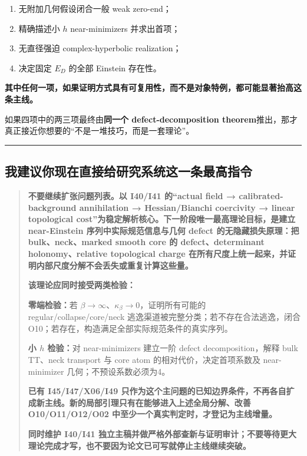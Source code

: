 \documentclass[
  10pt,
]{article}
\providecommand{\tightlist}{%
  \setlength{\itemsep}{0pt}\setlength{\parskip}{0pt}}
\begin{document}
\begin{enumerate}
\def\labelenumi{\arabic{enumi}.}
\tightlist
\item
  无附加几何假设闭合一般 weak zero-end；
\item
  精确描述小 \(h\) near-minimizers 并求出首项；
\item
  无直径强迫 complex-hyperbolic realization；
\item
  决定固定 \(E_D\) 的全部 Einstein 存在性。
\end{enumerate}

\textbf{其中任何一项，如果证明方式具有可复用性，而不是对象特例，都可能显著抬高这条主线。}

如果四项中的两三项最终由\textbf{同一个 defect-decomposition
theorem}推出，那才真正接近你想要的``不是一堆技巧，而是一套理论''。

\begin{center}\rule{0.5\linewidth}{0.5pt}\end{center}

\hypertarget{ux6211ux5efaux8baeux4f60ux73b0ux5728ux76f4ux63a5ux7ed9ux7814ux7a76ux7cfbux7edfux8fd9ux4e00ux6761ux6700ux9ad8ux6307ux4ee4}{%
\subsection{我建议你现在直接给研究系统这一条最高指令}\label{ux6211ux5efaux8baeux4f60ux73b0ux5728ux76f4ux63a5ux7ed9ux7814ux7a76ux7cfbux7edfux8fd9ux4e00ux6761ux6700ux9ad8ux6307ux4ee4}}

\begin{quote}
\textbf{不要继续扩张问题列表。以 I40/I41 的``actual field →
calibrated-background annihilation → Hessian/Bianchi coercivity → linear
topological cost''为稳定解析核心。下一阶段唯一最高理论目标，是建立
near-Einstein 序列中实际规范信息与几何 defect 的无隐藏损失原理：把
bulk、neck、marked smooth core 的 defect、determinant holonomy、relative
topological charge
在所有尺度上统一起来，并证明内部尺度分解不会丢失或重复计算这些量。}

\textbf{该理论应同时接受两类检验：}

\textbf{零端检验：}若
\(\beta\to\infty\)、\(\kappa_\beta\to0\)，证明所有可能的
regular/collapse/core/neck 逃逸渠道被完整分类；若不存在合法逃逸，闭合
O10；若存在，构造满足全部实际规范条件的真实序列。

\textbf{小 \(h\) 检验：}对 near-minimizers 建立一阶 defect
decomposition，解释 bulk TT、neck transport 与 core atom
的相对代价，决定首项系数及 near-minimizer 几何；不预设系数必须为4。

\textbf{已有 I45/I47/X06/I49
只作为这个主问题的已知边界条件，不再各自扩成新主线。新的局部引理只有在能够进入上述全局分解、改善
O10/O11/O12/O02 中至少一个真实判定时，才登记为主线增量。}

\textbf{同时维护 I40/I41
独立主稿并做严格外部查新与证明审计；不要等待更大理论完成才写，也不要因为论文已可写就停止主线继续突破。}
\end{quote}
\end{document}
